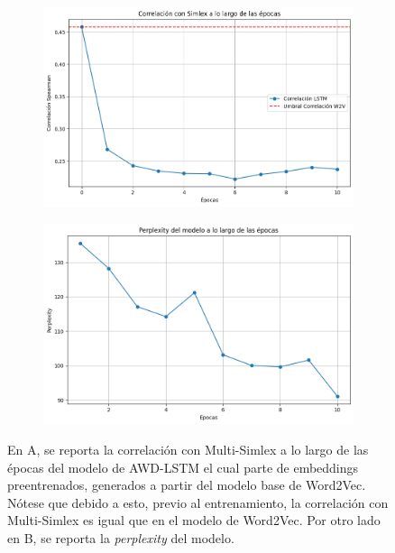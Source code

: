 
\begin{figure}[htb]
    \centering
    \begin{subfigure}[b]{0.45\textwidth}
        \centering
        \includegraphics[width=1\textwidth]{imagenes/simlex_corr_preembed.png}
        \caption{}
        \label{fig:simlex_corr_preembed.png}
    \end{subfigure}
    \hfill
    \begin{subfigure}[b]{0.45\textwidth}
        \centering
        \includegraphics[width=1\textwidth]{imagenes/perp_preembed.png}
        \caption{}
        \label{fig:perp_preembed.png}
    \end{subfigure}
    \caption{En A, se reporta la correlación con Multi-Simlex a lo largo de las épocas 
    del modelo de AWD-LSTM el cual parte de embeddings preentrenados, generados a 
    partir del modelo base de Word2Vec. Nótese que debido a esto, previo al 
    entrenamiento, la correlación con Multi-Simlex es igual que en el modelo 
    de Word2Vec. Por otro lado en B, se reporta la \textit{perplexity} del modelo.}
    \label{fig:preembed}
\end{figure}

